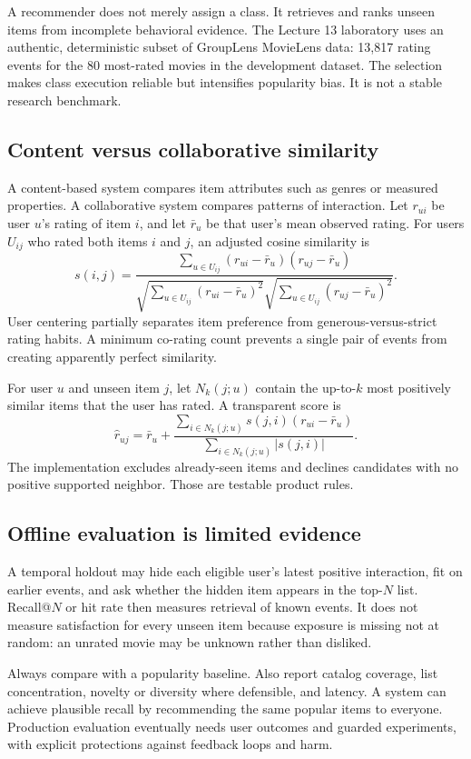 A recommender does not merely assign a class. It retrieves and ranks unseen
items from incomplete behavioral evidence. The Lecture 13 laboratory uses an
authentic, deterministic subset of GroupLens MovieLens data: 13,817 rating
events for the 80 most-rated movies in the  development
dataset. The selection makes class execution reliable but intensifies
popularity bias. It is not a stable research benchmark.

\subsection{Content versus collaborative similarity}

A content-based system compares item attributes such as genres or measured
properties. A collaborative system compares patterns of interaction. Let
$r_{ui}$ be user $u$'s rating of item $i$, and let $\bar r_u$ be that user's
mean observed rating. For users $U_{ij}$ who rated both items $i$ and $j$, an
adjusted cosine similarity is
\[
s(i,j)=
\frac{\sum_{u\in U_{ij}}(r_{ui}-\bar r_u)(r_{uj}-\bar r_u)}
{\sqrt{\sum_{u\in U_{ij}}(r_{ui}-\bar r_u)^2}
 \sqrt{\sum_{u\in U_{ij}}(r_{uj}-\bar r_u)^2}}.
\]
User centering partially separates item preference from generous-versus-strict
rating habits. A minimum co-rating count prevents a single pair of events from
creating apparently perfect similarity.

For user $u$ and unseen item $j$, let $N_k(j;u)$ contain the up-to-$k$ most
positively similar items that the user has rated. A transparent score is
\[
\widehat r_{uj}=\bar r_u+
\frac{\sum_{i\in N_k(j;u)}s(j,i)(r_{ui}-\bar r_u)}
{\sum_{i\in N_k(j;u)}|s(j,i)|}.
\]
The implementation excludes already-seen items and declines candidates with no
positive supported neighbor. Those are testable product rules.

\subsection{Offline evaluation is limited evidence}

A temporal holdout may hide each eligible user's latest positive interaction,
fit on earlier events, and ask whether the hidden item appears in the top-$N$
list. Recall@$N$ or hit rate then measures retrieval of known events. It does
not measure satisfaction for every unseen item because exposure is missing not
at random: an unrated movie may be unknown rather than disliked.

Always compare with a popularity baseline. Also report catalog coverage, list
concentration, novelty or diversity where defensible, and latency. A system can
achieve plausible recall by recommending the same popular items to everyone.
Production evaluation eventually needs user outcomes and guarded experiments,
with explicit protections against feedback loops and harm.

